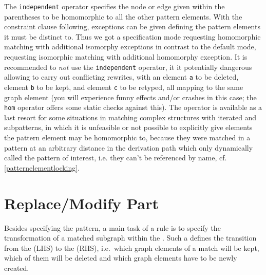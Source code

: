 The \texttt{independent} operator specifies the node or edge given within the parentheses to be homomorphic to all the other pattern elements.
With the constraint clause following, exceptions can be given defining the pattern elements it must be distinct to.
Thus we got a specification mode requesting homomorphic matching with additional isomorphy exceptions in contrast to the default mode,
requesting isomorphic matching with additional homomorphy exception.
It is recommended to \emph{not} use the \texttt{independent} operator, it it potentially dangerous allowing to carry out conflicting rewrites, with an element \texttt{a} to be deleted, element \texttt{b} to be kept, and element \texttt{c} to be retyped, all mapping to the same graph element (you will experience funny effects and/or crashes in this case; the \texttt{hom} operator offers some static checks against this).
The operator is available as a last resort for some situations in matching complex structures with iterated and subpatterns, 
in which it is unfeasible or not possible to explicitly give elements the pattern element may be homomorphic to,
because they were matched in a pattern at an arbitrary distance in the derivation path which only dynamically called the pattern of interest,
i.e. they can't be referenced by name, cf. \ref{patternelementlocking}.


\section{Replace/Modify Part}
\label{sec:replacemodify}
Besides specifying the pattern, a main task of a rule is to specify the transformation of a matched subgraph within the .
Such a  defines the transition from the  (LHS) to the  (RHS), i.e.\ which graph elements of a match will be kept, which of them will be deleted and which graph elements have to be newly created.

